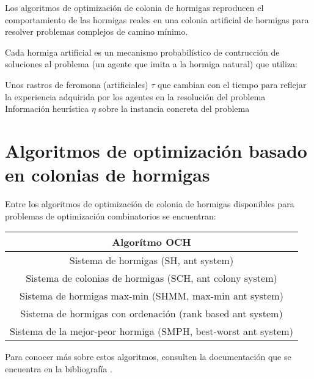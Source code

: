 \documentclass[10pt,a4paper]{article}
\begin{document}
Los algoritmos de optimización de colonia de hormigas reproducen el comportamiento de las hormigas reales en una colonia artificial de hormigas para resolver problemas complejos de camino mínimo.

Cada hormiga artificial es un mecanismo probabilístico de contrucción de soluciones al problema (un agente que imita a la hormiga natural) que utiliza:
\begin{center}
	\begin{description}
		Unos rastros de feromona (artificiales) $\tau$ que cambian con el tiempo para reflejar la experiencia 		adquirida por los agentes en la resolución del problema
		Información heurística $\eta$ sobre la instancia concreta del problema
	\end{description}
\end{center}

\section{Algoritmos de optimización basado en colonias de hormigas}
Entre los algoritmos de optimización de colonia de hormigas disponibles para problemas de optimización combinatorios se encuentran: \\

\begin{center}
\begin{tabular}{|c|}
\hline 
Algorítmo OCH \\ 
\hline 
Sistema de hormigas (SH, ant system) \\ 
\hline 
Sistema de colonias de hormigas (SCH, ant colony system) \\ 
\hline 
Sistema de hormigas max-min (SHMM, max-min ant system) \\ 
\hline 
Sistema de hormigas con ordenación (rank based ant system) \\ 
\hline 
Sistema de la mejor-peor hormiga (SMPH, best-worst ant system) \\ 
\hline 
\end{tabular}
\end{center} 
 
Para conocer más sobre estos algoritmos, consulten la documentación que se encuentra en la bibliografía \cite{Apuntes}.




\end{document}
